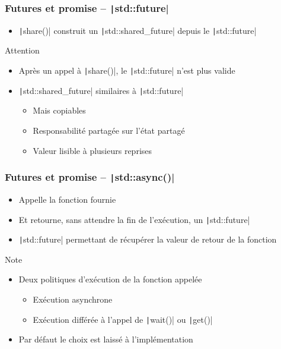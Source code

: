 \documentclass[C++.tex]{subfiles}
\begin{document}
\begin{frame}[fragile]
	\frametitle{Futures et promise -- \texttt|std::future|}
	\begin{itemize}
		\item \texttt|share()| construit un \texttt|std::shared_future| depuis le \texttt|std::future|
	\end{itemize}

	\begin{alertblock}{Attention}
		\begin{itemize}
			\item Après un appel à \texttt|share()|, le \texttt|std::future| n'est plus valide
		\end{itemize}
	\end{alertblock}

	\begin{itemize}
		\item \texttt|std::shared_future| similaires à \texttt|std::future|
		\begin{itemize}
			\item Mais copiables
			\item Responsabilité partagée sur l'état partagé
			\item Valeur lisible à plusieurs reprises
		\end{itemize}
	\end{itemize}
\end{frame}

\begin{frame}[fragile]
	\frametitle{Futures et promise -- \texttt|std::async()|}
	\begin{itemize}
		\item Appelle la fonction fournie
		\item Et retourne, sans attendre la fin de l'exécution, un \texttt|std::future|
		\item \texttt|std::future| permettant de récupérer la valeur de retour de la fonction
	\end{itemize}

	\begin{block}{Note}
		\begin{itemize}
			\item Deux politiques d'exécution de la fonction appelée
			\begin{itemize}
				\item Exécution asynchrone
				\item Exécution différée à l'appel de \texttt|wait()| ou \texttt|get()|
			\end{itemize}
			\item Par défaut le choix est laissé à l'implémentation
		\end{itemize}
	\end{block}
\end{frame}
\end{document}
